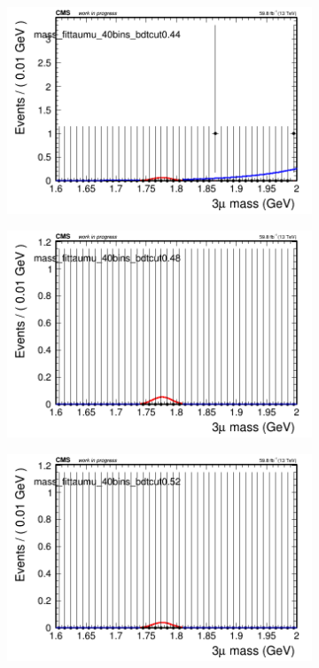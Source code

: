 \begin{figure}[H]
\begin{subfigure}{0.2\textwidth}
        \includegraphics[width=\textwidth]{power_law/plots/taumu/massfit_taumu_40bins_bdtcut0.44.png}
        \caption{}
    \end{subfigure}
    \begin{subfigure}{0.2\textwidth}
        \includegraphics[width=\textwidth]{power_law/plots/taumu/massfit_taumu_40bins_bdtcut0.48.png}
        \caption{}
    \end{subfigure}
    \begin{subfigure}{0.2\textwidth}
        \includegraphics[width=\textwidth]{power_law/plots/taumu/massfit_taumu_40bins_bdtcut0.52.png}

\end{subfigure}
\end{figure}
